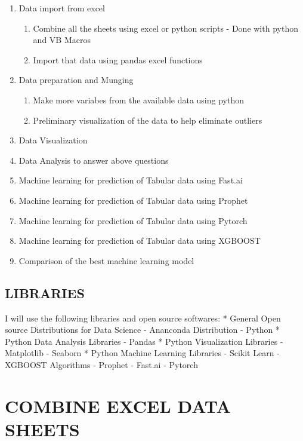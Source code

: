 \documentclass[11pt]{article}
\providecommand{\tightlist}{%
      \setlength{\itemsep}{0pt}\setlength{\parskip}{0pt}}
\begin{document}
    \begin{enumerate}
\def\labelenumi{\arabic{enumi}.}
\tightlist
\item
  Data import from excel

  \begin{enumerate}
  \def\labelenumii{\arabic{enumii}.}
  \tightlist
  \item
    Combine all the sheets using excel or python scripts - Done with
    python and VB Macros
  \item
    Import that data using pandas excel functions
  \end{enumerate}
\item
  Data preparation and Munging

  \begin{enumerate}
  \def\labelenumii{\arabic{enumii}.}
  \tightlist
  \item
    Make more variabes from the available data using python
  \item
    Preliminary visualization of the data to help eliminate outliers
  \end{enumerate}
\item
  Data Visualization
\item
  Data Analysis to answer above questions
\item
  Machine learning for prediction of Tabular data using Fast.ai
\item
  Machine learning for prediction of Tabular data using Prophet
\item
  Machine learning for prediction of Tabular data using Pytorch
\item
  Machine learning for prediction of Tabular data using XGBOOST
\item
  Comparison of the best machine learning model
\end{enumerate}

    \hypertarget{libraries}{%
\subsection{LIBRARIES}\label{libraries}}

    I will use the following libraries and open source softwares: * General
Open source Distributions for Data Science - Ananconda Distribution -
Python * Python Data Analysis Libraries - Pandas * Python Visualization
Libraries - Matplotlib - Seaborn * Python Machine Learning Libraries -
Scikit Learn - XGBOOST Algorithms - Prophet - Fast.ai - Pytorch

    \hypertarget{combine-excel-data-sheets}{%
\section{COMBINE EXCEL DATA SHEETS}\label{combine-excel-data-sheets}}
\end{document}
